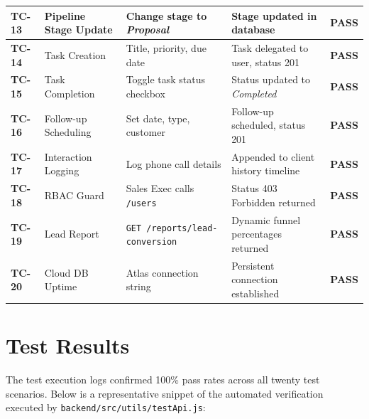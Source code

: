 \begin{table}[h!]
\begin{tabular}{|p{1.2cm}|p{3.2cm}|p{3.5cm}|p{3.5cm}|p{1.4cm}|}
\textbf{TC-13} & Pipeline Stage Update& Change stage to \textit{Proposal} & Stage updated in database & \textbf{PASS} \\ \hline
\textbf{TC-14} & Task Creation & Title, priority, due date & Task delegated to user, status 201 & \textbf{PASS} \\ \hline
\textbf{TC-15} & Task Completion & Toggle task status checkbox & Status updated to \textit{Completed} & \textbf{PASS} \\ \hline
\textbf{TC-16} & Follow-up Scheduling& Set date, type, customer & Follow-up scheduled, status 201 & \textbf{PASS} \\ \hline
\textbf{TC-17} & Interaction Logging & Log phone call details & Appended to client history timeline & \textbf{PASS} \\ \hline
\textbf{TC-18} & RBAC Guard & Sales Exec calls \texttt{/users} & Status 403 Forbidden returned & \textbf{PASS} \\ \hline
\textbf{TC-19} & Lead Report & \texttt{GET /reports/lead-conversion}& Dynamic funnel percentages returned & \textbf{PASS} \\ \hline
\textbf{TC-20} & Cloud DB Uptime & Atlas connection string & Persistent connection established & \textbf{PASS} \\ \hline
\end{tabular}
\end{table}

\section{Test Results}
The test execution logs confirmed 100\% pass rates across all twenty test scenarios. Below is a representative snippet of the automated verification executed by \texttt{backend/src/utils/testApi.js}:

